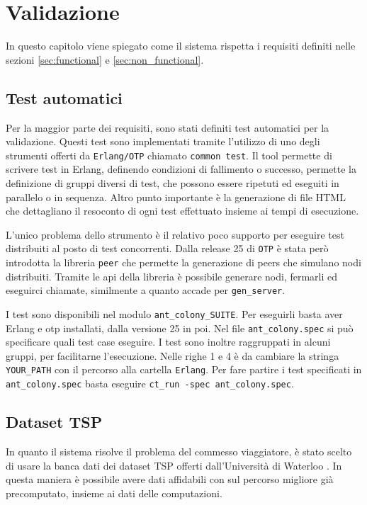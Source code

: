 \chapter{Validazione}
In questo capitolo viene spiegato come il sistema rispetta i requisiti definiti nelle sezioni \ref{sec:functional} e \ref{sec:non_functional}.

\section{Test automatici}
Per la maggior parte dei requisiti, sono stati definiti test automatici per la validazione.
Questi test sono implementati tramite l'utilizzo di uno degli strumenti offerti da \texttt{Erlang/OTP}
chiamato \texttt{common test}. 
Il tool permette di scrivere test in Erlang, definendo condizioni di fallimento o successo,
permette la definizione di gruppi diversi di test, che possono essere ripetuti ed eseguiti in parallelo
o in sequenza. Altro punto importante è la generazione di file HTML che dettagliano
il resoconto di ogni test effettuato insieme ai tempi di esecuzione.

L'unico problema dello strumento è il relativo poco supporto per eseguire test distribuiti
al posto di test concorrenti. Dalla release 25 di \texttt{OTP} è stata però introdotta la libreria
\texttt{peer} che permette la generazione di peers che simulano nodi distribuiti.
Tramite le api della libreria è possibile generare nodi, fermarli ed eseguirci chiamate,
similmente a quanto accade per \texttt{gen\_server}.

I test sono disponibili nel modulo \texttt{ant\_colony\_SUITE}. 
Per eseguirli basta aver Erlang e otp installati, dalla versione 25 in poi.
Nel file \texttt{ant\_colony.spec} si può specificare quali test case eseguire.
I test sono inoltre raggruppati in alcuni gruppi, per facilitarne l'esecuzione.
Nelle righe 1 e 4 è da cambiare la stringa \texttt{YOUR\_PATH} con il percorso
alla cartella \texttt{Erlang}.
Per fare partire i test specificati in \texttt{ant\_colony.spec} basta eseguire 
\texttt{ct\_run -spec ant\_colony.spec}.

\section{Dataset TSP}
In quanto il sistema risolve il problema del commesso viaggiatore, è stato scelto
di usare la banca dati dei dataset TSP offerti dall'Università di Waterloo \cite{uwaterlooNationalTraveling}.
In questa maniera è possibile avere dati affidabili con sul percorso migliore già precomputato,
insieme ai dati delle computazioni.
